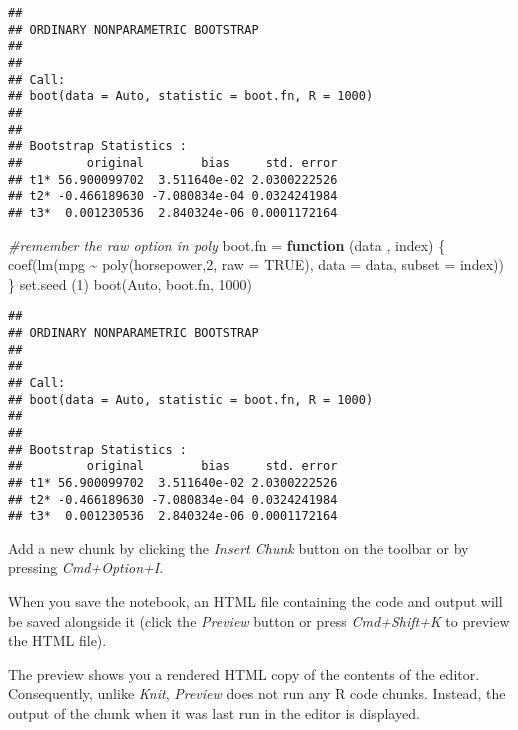 \documentclass[
]{article}
\newenvironment{Shaded}{\begin{snugshade}}{\end{snugshade}}
\newcommand{\AttributeTok}[1]{\textcolor[rgb]{0.77,0.63,0.00}{#1}}
\newcommand{\CommentTok}[1]{\textcolor[rgb]{0.56,0.35,0.01}{\textit{#1}}}
\newcommand{\ConstantTok}[1]{\textcolor[rgb]{0.00,0.00,0.00}{#1}}
\newcommand{\ControlFlowTok}[1]{\textcolor[rgb]{0.13,0.29,0.53}{\textbf{#1}}}
\newcommand{\DecValTok}[1]{\textcolor[rgb]{0.00,0.00,0.81}{#1}}
\newcommand{\FunctionTok}[1]{\textcolor[rgb]{0.00,0.00,0.00}{#1}}
\newcommand{\NormalTok}[1]{#1}
\newcommand{\OtherTok}[1]{\textcolor[rgb]{0.56,0.35,0.01}{#1}}
\newcommand{\SpecialCharTok}[1]{\textcolor[rgb]{0.00,0.00,0.00}{#1}}
\begin{document}
\begin{verbatim}
## 
## ORDINARY NONPARAMETRIC BOOTSTRAP
## 
## 
## Call:
## boot(data = Auto, statistic = boot.fn, R = 1000)
## 
## 
## Bootstrap Statistics :
##         original        bias     std. error
## t1* 56.900099702  3.511640e-02 2.0300222526
## t2* -0.466189630 -7.080834e-04 0.0324241984
## t3*  0.001230536  2.840324e-06 0.0001172164
\end{verbatim}

\begin{Shaded}
\begin{Highlighting}[]
\CommentTok{\#remember the raw option in poly}
\NormalTok{boot.fn }\OtherTok{=} \ControlFlowTok{function}\NormalTok{ (data , index) \{}
  \FunctionTok{coef}\NormalTok{(}\FunctionTok{lm}\NormalTok{(mpg }\SpecialCharTok{\textasciitilde{}} \FunctionTok{poly}\NormalTok{(horsepower,}\DecValTok{2}\NormalTok{, }\AttributeTok{raw =} \ConstantTok{TRUE}\NormalTok{), }\AttributeTok{data =}\NormalTok{ data, }\AttributeTok{subset =}\NormalTok{ index))}
\NormalTok{\}}
\FunctionTok{set.seed}\NormalTok{ (}\DecValTok{1}\NormalTok{)}
\FunctionTok{boot}\NormalTok{(Auto, boot.fn, }\DecValTok{1000}\NormalTok{)}
\end{Highlighting}
\end{Shaded}

\begin{verbatim}
## 
## ORDINARY NONPARAMETRIC BOOTSTRAP
## 
## 
## Call:
## boot(data = Auto, statistic = boot.fn, R = 1000)
## 
## 
## Bootstrap Statistics :
##         original        bias     std. error
## t1* 56.900099702  3.511640e-02 2.0300222526
## t2* -0.466189630 -7.080834e-04 0.0324241984
## t3*  0.001230536  2.840324e-06 0.0001172164
\end{verbatim}

Add a new chunk by clicking the \emph{Insert Chunk} button on the
toolbar or by pressing \emph{Cmd+Option+I}.

When you save the notebook, an HTML file containing the code and output
will be saved alongside it (click the \emph{Preview} button or press
\emph{Cmd+Shift+K} to preview the HTML file).

The preview shows you a rendered HTML copy of the contents of the
editor. Consequently, unlike \emph{Knit}, \emph{Preview} does not run
any R code chunks. Instead, the output of the chunk when it was last run
in the editor is displayed.
\end{document}
